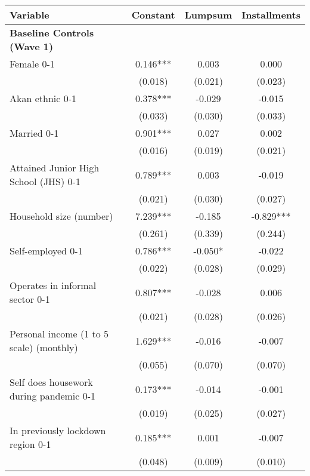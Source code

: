 \begin{tabular}{lccc}
\hline
 Variable & Constant & Lumpsum & Installments \\ [0.1em] 
\hline\hline
\textbf{Baseline Controls (Wave 1)} & & & \\ 
 Female 0-1 & 0.146*** & 0.003 & 0.000 \\ [0.1em] 
                   &      (0.018)     &      (0.021)     &      (0.023)     \\ [0.1em] 
 Akan ethnic 0-1 & 0.378*** & -0.029 & -0.015 \\ [0.1em] 
                   &      (0.033)     &      (0.030)     &      (0.033)     \\ [0.1em] 
 Married 0-1 & 0.901*** & 0.027 & 0.002 \\ [0.1em] 
                   &      (0.016)     &      (0.019)     &      (0.021)     \\ [0.1em] 
 Attained Junior High School (JHS) 0-1 & 0.789*** & 0.003 & -0.019 \\ [0.1em] 
                   &      (0.021)     &      (0.030)     &      (0.027)     \\ [0.1em] 
 Household size (number) & 7.239*** & -0.185 & -0.829*** \\ [0.1em] 
                   &      (0.261)     &      (0.339)     &      (0.244)     \\ [0.1em] 
 Self-employed 0-1 & 0.786*** & -0.050* & -0.022 \\ [0.1em] 
                   &      (0.022)     &      (0.028)     &      (0.029)     \\ [0.1em] 
 Operates in informal sector 0-1 & 0.807*** & -0.028 & 0.006 \\ [0.1em] 
                   &      (0.021)     &      (0.028)     &      (0.026)     \\ [0.1em] 
 Personal income (1 to 5 scale) (monthly) & 1.629*** & -0.016 & -0.007 \\ [0.1em] 
                   &      (0.055)     &      (0.070)     &      (0.070)     \\ [0.1em] 
 Self does housework during pandemic 0-1 & 0.173*** & -0.014 & -0.001 \\ [0.1em] 
                   &      (0.019)     &      (0.025)     &      (0.027)     \\ [0.1em] 
 In previously lockdown region 0-1 & 0.185*** & 0.001 & -0.007 \\ [0.1em] 
                   &      (0.048)     &      (0.009)     &      (0.010)     \\ [0.1em] 

\end{tabular}
